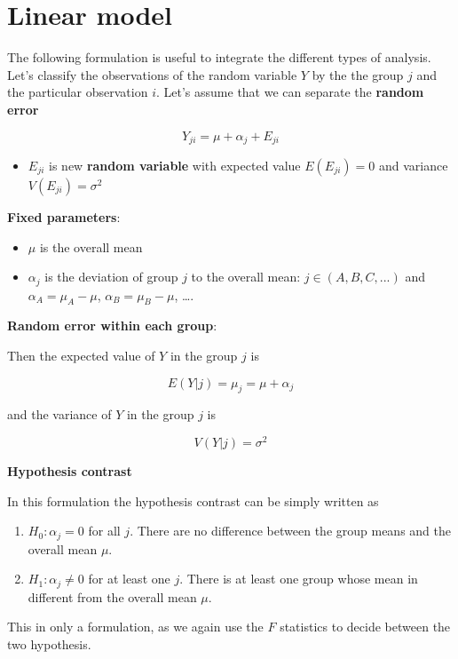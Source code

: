 \documentclass[
]{book}
\providecommand{\tightlist}{%
  \setlength{\itemsep}{0pt}\setlength{\parskip}{0pt}}
\begin{document}
\hypertarget{linear-model}{%
\section{Linear model}\label{linear-model}}

The following formulation is useful to integrate the different types of analysis. Let's classify the observations of the random variable \(Y\) by the the group \(j\) and the particular observation \(i\). Let's assume that we can separate the \textbf{random error}

\[Y_{ji} = \mu + \alpha_j +E_{ji}\]

\begin{itemize}
\tightlist
\item
  \(E_{ji}\) is new \textbf{random variable} with expected value \(E(E_{ji})=0\) and variance \(V(E_{ji})=\sigma^2\)
\end{itemize}

\textbf{Fixed parameters}:

\begin{itemize}
\tightlist
\item
  \(\mu\) is the overall mean
\item
  \(\alpha_j\) is the deviation of group \(j\) to the overall mean: \(j \in (A,B, C, ...)\) and \(\alpha_A=\mu_A-\mu\), \(\alpha_B=\mu_B-\mu\), \ldots.
\end{itemize}

\textbf{Random error within each group}:

Then the expected value of \(Y\) in the group \(j\) is

\[E(Y| j)=\mu_j=\mu + \alpha_j\]

and the variance of \(Y\) in the group \(j\) is

\[V(Y| j)=\sigma^2\]

\textbf{Hypothesis contrast}

In this formulation the hypothesis contrast can be simply written as

\begin{enumerate}
\def\labelenumi{\alph{enumi}.}
\item
  \(H_0:\alpha_j=0\) for all \(j\). There are no difference between the group means and the overall mean \(\mu\).
\item
  \(H_1:\alpha_j\neq0\) for at least one \(j\). There is at least one group whose mean in different from the overall mean \(\mu\).
\end{enumerate}

This in only a formulation, as we again use the \(F\) statistics to decide between the two hypothesis.
\end{document}
